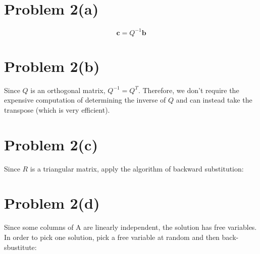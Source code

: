 \documentclass{article}
\newif\ifstays
\newenvironment{pgm}{
  \begin{center}\begin{tabbing}
  xx \= xx \= xx \= xx \= xx \= xx \= xx \= xx \= xx \= xx \= xx \= \kill\>\+}{
  \end{tabbing}\end{center}}
\begin{document}
\section*{Problem 2(a)}

$$ \mathbf{c} = Q^{-1}\mathbf{b}$$

\section*{Problem 2(b)}

Since $Q$ is an orthogonal matrix, $Q^{-1} = Q^{T}$. Therefore, we don't require the expensive computation of determining the inverse of $Q$ and can instead take the transpose (which is very efficient).

\section*{Problem 2(c)}

Since $R$ is a triangular matrix, apply the algorithm of backward substitution:

\ifstays
Here is one way to render the Gram-Schmidt pseudo-code in \LaTeX. You can use this as a template to write your own pseudo-code.
\newcommand{\ba}{\mathbf{a}}
\newcommand{\bq}{\mathbf{q}}
\begin{pgm}
\mbox{}\+\+\+\+\\
$r = 0$\\
for $j=1$ to $n$\+\\
$\ba'_{j} = \ba_{j} - \sum_{i=1}^{r} (\bq_{i}^{T}\ba_{j})\bq_{i}$\\
if $\|\ba'_{j}\| \neq \mathbf{0}$\+\\
  $r = r+1$\\
  $\bq_{r} = \frac{\ba'_{j}}{\|\ba'_{j}\|}$\-\\
end\-\\
end
\end{pgm}
The \verb#\+# and \verb#\-# commands tell the interpreter respectively to add or remove one indentation tab from subsequent lines. The \texttt{pgm} environment is defined for you in the preamble of the \verb#template.tex# file.
\fi

\section*{Problem 2(d)}

Since some columns of A are linearly independent, the solution has free variables. In order to pick one solution, pick a free variable at random and then back-sbustitute:
\end{document}
